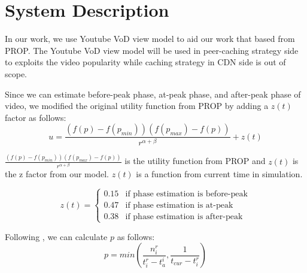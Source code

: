 \section{System Description}\label{systemdescription}
In our work, we use Youtube VoD view model to aid our work that based from PROP. 
The Youtube VoD view model will be used in peer-caching strategy side to exploits the video popularity while caching strategy in CDN side is out of scope. 

Since we can estimate before-peak phase, at-peak phase, and after-peak phase of video, we modified the original utility function from PROP by adding a $z(t)$ factor as follows:
\begin{equation}
u = \frac{ (f(p) - f(p_{min})) (f(p_{max}) - f(p)) }{r^{\alpha + \beta}} + z(t)
\end{equation}

$\frac{ (f(p) - f(p_{min})) (f(p_{max}) - f(p)) }{r^{\alpha + \beta}}$ is the utility function from PROP and $z(t)$ is the z factor from our model.
$z(t)$ is a function from current time in simulation.


\[
 z(t) =
  \begin{cases}
   0.15 & \text{if phase estimation is before-peak} \\
   0.47 & \text{if phase estimation is at-peak} \\
   0.38 & \text{if phase estimation is after-peak}
  \end{cases}
\]

Following \cite{1613869}, we can calculate $p$ as follows:
\begin{equation}
p = min \left(\frac{n_i^r}{t_i^r - t_a^i}  , \frac{1}{t_{cur} - t_i^r}\right)
\end{equation}


